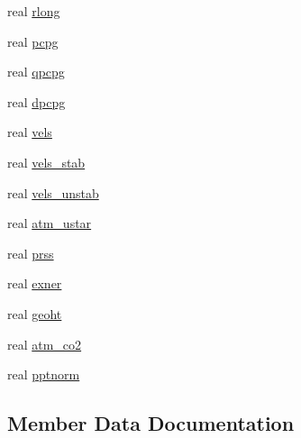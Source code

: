\begin{DoxyCompactItemize}
\item 
real \hyperlink{structmet__driver__coms_1_1met__driv__state_a97b5a0d3e0d91625cc9f7ce5466250d3}{rlong}
\item 
real \hyperlink{structmet__driver__coms_1_1met__driv__state_a6743d2024c42fd16c0bb66a27aee7dab}{pcpg}
\item 
real \hyperlink{structmet__driver__coms_1_1met__driv__state_af1d92bf111e5ecc9504425bb9b686510}{qpcpg}
\item 
real \hyperlink{structmet__driver__coms_1_1met__driv__state_a89b39d6539ca58bb0d67f72f0a9cca3a}{dpcpg}
\item 
real \hyperlink{structmet__driver__coms_1_1met__driv__state_a2f1468290cf4c5191ff3305516f403b4}{vels}
\item 
real \hyperlink{structmet__driver__coms_1_1met__driv__state_aea2f12c370f025cc899515c9043dbdb9}{vels\+\_\+stab}
\item 
real \hyperlink{structmet__driver__coms_1_1met__driv__state_a5237ae89349cfee1060065ed728b8bb1}{vels\+\_\+unstab}
\item 
real \hyperlink{structmet__driver__coms_1_1met__driv__state_a2ae1bf578a610d259dc6312cfe52bd6c}{atm\+\_\+ustar}
\item 
real \hyperlink{structmet__driver__coms_1_1met__driv__state_a06b520bcea3424567bf379011fe40e73}{prss}
\item 
real \hyperlink{structmet__driver__coms_1_1met__driv__state_ac473e9c3fd6e4d935a49ba24ef15d26b}{exner}
\item 
real \hyperlink{structmet__driver__coms_1_1met__driv__state_a511aa6dfb471f836dbe7e0e0e6124d3e}{geoht}
\item 
real \hyperlink{structmet__driver__coms_1_1met__driv__state_ab05d25010c91731e9503dbd6a618dd95}{atm\+\_\+co2}
\item 
real \hyperlink{structmet__driver__coms_1_1met__driv__state_a940ce4816665900d5de54bd07c5b87ec}{pptnorm}
\end{DoxyCompactItemize}


\subsection{Member Data Documentation}
\hypertarget{structmet__driver__coms_1_1met__driv__state_ab05d25010c91731e9503dbd6a618dd95}{}
